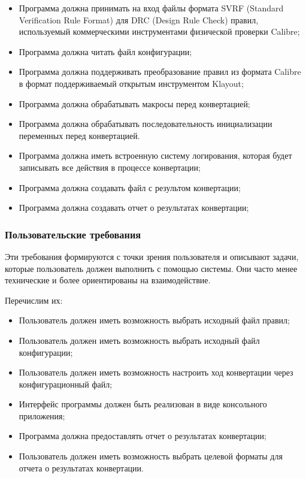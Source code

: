 \begin{itemize}
    \item Программа должна принимать на вход файлы
		формата SVRF (Standard Verification Rule Format)
		для DRC (Design Rule Check) правил,
		используемый коммерческими инструментами физической проверки
		Calibre;
	\item Программа должна читать файл конфигурации;
    \item Программа должна поддерживать преобразование правил из формата
		Calibre в формат поддерживаемый открытым инструментом Klayout;
    \item Программа должна обрабатывать макросы перед конвертацией;
    \item Программа должна обрабатывать последовательность 
		инициализации переменных перед конвертацией.
	\item Программа должна иметь встроенную систему логирования,
		которая будет записывать все действия в процессе конвертации;
	\item Программа должна создавать файл с результом конвертации;
	\item Программа должна создавать отчет о результатах конвертации;
\end{itemize}

\subsubsection{Пользовательские требования}

Эти требования формируются с точки зрения пользователя и описывают задачи,
которые пользователь должен выполнить с помощью системы.
Они часто менее технические и более ориентированы на взаимодействие.

Перечислим их:

\begin{itemize}
    \item Пользователь должен иметь возможность выбрать исходный файл правил;
    \item Пользователь должен иметь возможность
		выбрать исходный файл конфигурации;
    \item Пользователь должен иметь возможность настроить ход конвертации
		через конфигурационный файл;
    \item Интерфейс программы должен быть реализован
		в виде консольного приложения;
    \item Программа должна предоставлять отчет о результатах конвертации;
    \item Пользователь должен иметь возможность выбрать
		целевой форматы для отчета о результатах конвертации.
\end{itemize}

